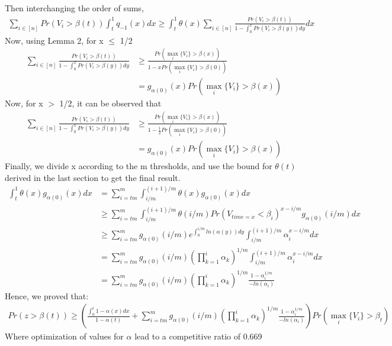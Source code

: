 \documentclass[12pt, letterpaper, twoside]{article}
\begin{document}
Then interchanging the order of sums,
\begin{align*}
\sum_{i \in [n]} Pr(V_{i} > \beta(t)) \int_{t}^{1} q_{-1}(x) dx \geq \int_{t}^{1} \theta(x) \sum_{i \in [n]} \frac{Pr(V_{i} > \beta(t))}{1 - \int_{0}^{x} Pr(V_{i} > \beta(y)) dy} dx
\end{align*}
Now, using Lemma 2, for x $\leq$ 1/2
\begin{align*}
\sum_{i \in [n]} \frac{Pr(V_{i} > \beta(t))}{1 - \int_{0}^{x} Pr(V_{i} > \beta(y)) dy} &\geq \frac{Pr(\max_{i} \{V_{i}\} > \beta(x))}{1-xPr(\max_{i} \{V_{i}\} > \beta(0))}\\
&= g_{\alpha(0)} (x) Pr(\max_{i} \{V_{i}\} > \beta(x))
\end{align*}
Now, for x $>$ 1/2, it can be observed that \\
\begin{align*}
\sum_{i \in [n]} \frac{Pr(V_{i} > \beta(t))}{1 - \int_{0}^{x} Pr(V_{i} > \beta(y)) dy} &\geq \frac{Pr(\max_{i} \{V_{i}\} > \beta(x))}{1-\frac{1}{2}Pr(\max_{i} \{V_{i}\} > \beta(0))} \\
&= g_{\alpha(0)} (x) Pr(\max_{i} \{V_{i}\} > \beta(x))
\end{align*}
Finally, we divide x according to the m thresholds, and use the bound for $\theta(t)$ derived in the last section to get the final result.
\begin{align*}
\int_{t}^{1} \theta(x) g_{\alpha(0)} (x) dx &= \sum_{i = tm}^{m} \int_{i/m}^{(i+1)/m} \theta(x) g_{\alpha(0)} (x) dx\\
&\geq \sum_{i = tm}^{m} \int_{i/m}^{(i+1)/m} \theta(i/m) Pr(V_{time=x} < \beta_{i})^{x - i/m} g_{\alpha(0)} (i/m) dx\\
&\geq \sum_{i = tm}^{m} g_{\alpha(0)}(i/m) e^{\int_{0}^{i/m} ln(\alpha(y)) dy} \int_{i/m}^{(i+1)/m} \alpha_{i}^{x - i/m}  dx\\
&= \sum_{i = tm}^{m} g_{\alpha(0)}(i/m) (\prod_{k=1}^{i} \alpha_{k})^{1/m} \int_{i/m}^{(i+1)/m} \alpha_{i}^{x - i/m}  dx\\
&= \sum_{i = tm}^{m} g_{\alpha(0)}(i/m) (\prod_{k=1}^{i} \alpha_{k})^{1/m} \frac{1 - \alpha_{i} ^ {1/m}}{-ln(\alpha_{i})}
\end{align*}
Hence, we proved that:
\begin{align*}
Pr(z > \beta(t)) \geq (\frac{\int_{0}^{t} 1 - \alpha(x) dx}{1-\alpha(t)} + \sum_{i = tm}^{m} g_{\alpha(0)}(i/m) (\prod_{k=1}^{i} \alpha_{k})^{1/m} \frac{1 - \alpha_{i} ^ {1/m}}{-ln(\alpha_{i})}) Pr(\max_{i} \{V_{i}\} > \beta_{t})
\end{align*}
Where optimization of values for $\alpha$ lead to a competitive ratio of 0.669
\end{document}
